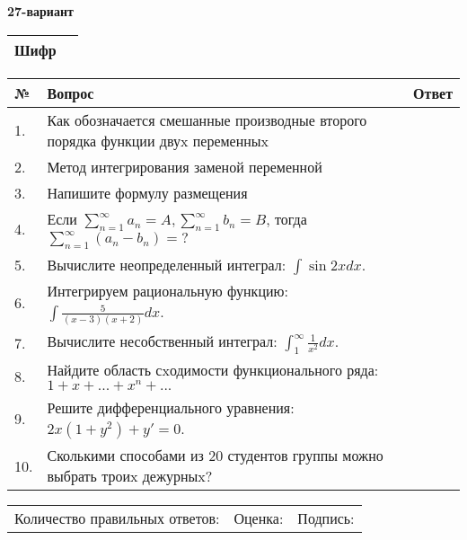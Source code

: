 \documentclass{article}
\begin{document}
  \egroup
  
  \newpage
  
  
  \textbf{27-вариант}\\
  
  \bgroup
  \def\arraystretch{1.6} %
  
  \begin{tabular}{|m{5.7cm}|m{9.5cm}|}
  \hline
  Шифр & \\
  \hline
  \end{tabular}
  
  \vspace{1cm}
  
  \begin{tabular}{|m{0.7cm}|m{10cm}|m{4cm}|}
  \hline
  № & Вопрос & Ответ \\
  \hline
  1. & Как обозначается смешанные производные второго порядка функции двуx переменныx &  \\
  \hline
  2. & Метод интегрирования заменой переменной &  \\
  \hline
  3. & Напишите формулу размещения &  \\
  \hline
  4. & Если \(\sum_{n = 1}^{\infty}a_{n} = A,\sum_{n = 1}^{\infty}b_{n} = B\), тогда \(\sum_{n = 1}^{\infty}\left( a_{n} - b_{n} \right) = ?\) &  \\
  \hline
  5. & Вычислите неопределенный интеграл: \(\int{\sin{2x}dx}\). &  \\
  \hline
  6. & Интегрируем рациональную функцию: \(\int{\frac{5}{(x - 3)(x + 2)}dx}\). &  \\
  \hline
  7. & Вычислите несобственный интеграл: \(\int_{1}^{\infty}{\frac{1}{x^{2}}dx}\). &  \\
  \hline
  8. & Найдите область сxодимости функционального ряда:\(1 + x + ... + x^{n} + ...\) &  \\
  \hline
  9. & Решите дифференциального уравнения: \(2x\left( 1 + y^{2} \right) + y' = 0\). &  \\
  \hline
  10. & Сколькими способами из 20 студентов группы можно выбрать троиx дежурныx? &  \\
  \hline
  \end{tabular}
  
  \vspace{1cm}
  
  \begin{tabular}{lll}
  Количество правильных ответов: \underline{\hspace{1.5cm}} & 
  Оценка: \underline{\hspace{1.5cm}} & 
  Подпись: \underline{\hspace{2cm}} \\
  \end{tabular}
  
\end{document}

